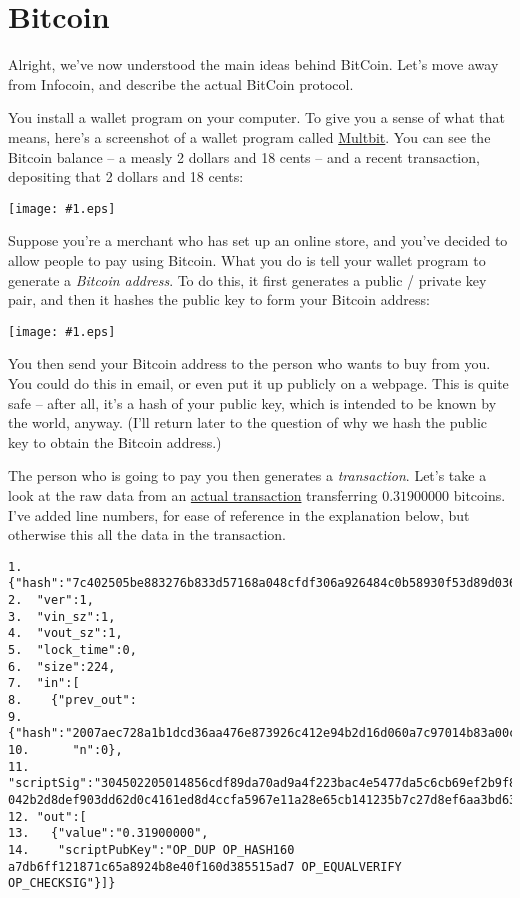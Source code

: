\documentclass[12pt]{book}
\newcommand{\img}[2]{\begin{center}\texttt{[image: \#1.eps]}\end{center}}
\newcommand{\link}[2]{\href{#1}{#2}}
\begin{document}
\section{Bitcoin}

Alright, we've now understood the main ideas behind BitCoin.  Let's
move away from Infocoin, and describe the actual BitCoin protocol.

You install a wallet program on your computer.  To give you a sense of
what that means, here's a screenshot of a wallet program called
\link{https://multibit.org/}{Multbit}.  You can see the Bitcoin
balance -- a measly 2 dollars and 18 cents -- and a recent
transaction, depositing that 2 dollars and 18 cents:
% 
\img{images/wallet_transaction}{400px}
%
Suppose you're a merchant who has set up an online store, and you've
decided to allow people to pay using Bitcoin.  What you do is tell
your wallet program to generate a \emph{Bitcoin address}.  To do this,
it first generates a public / private key pair, and then it hashes the
public key to form your Bitcoin address:
%
\img{images/bitcoin_address}{400px}
%
You then send your Bitcoin address to the person who wants to buy from
you.  You could do this in email, or even put it up publicly on a
webpage.  This is quite safe -- after all, it's a hash of your public
key, which is intended to be known by the world, anyway.  (I'll return
later to the question of why we hash the public key to obtain the
Bitcoin address.)

The person who is going to pay you then generates a
\emph{transaction}.  Let's take a look at the raw data from an
\link{http://blockexplorer.com/tx/7c402505be883276b833d57168a048cfdf306a926484c0b58930f53d89d036f9}{actual
  transaction} transferring $0.31900000$ bitcoins.  I've added line
numbers, for ease of reference in the explanation below, but otherwise
this all the data in the transaction.
\begin{Verbatim}[fontsize=\small]
1.  {"hash":"7c402505be883276b833d57168a048cfdf306a926484c0b58930f53d89d036f9",
2.  "ver":1,
3.  "vin_sz":1,
4.  "vout_sz":1,
5.  "lock_time":0,
6.  "size":224,
7.  "in":[
8.    {"prev_out":
9.      {"hash":"2007aec728a1b1dcd36aa476e873926c412e94b2d16d060a7c97014b83a00c3e",
10.      "n":0},
11.    "scriptSig":"304502205014856cdf89da70ad9a4f223bac4e5477da5c6cb69ef2b9f8b5f8548e21307e0221009bfe2698f1eb1c561f41981d8e78c11d9e685a70e682f144ee6c8ab5ecb0497c01 042b2d8def903dd62d0c4161ed8d4ccfa5967e11a28e65cb141235b7c27d8ef6aa3bd63be077323cf3d7e0e8895b264b94feb4b40478b431da6f45dfc8e1004f62"}],
12. "out":[
13.   {"value":"0.31900000",
14.    "scriptPubKey":"OP_DUP OP_HASH160 a7db6ff121871c65a8924b8e40f160d385515ad7 OP_EQUALVERIFY OP_CHECKSIG"}]}
\end{Verbatim}
\end{document}
